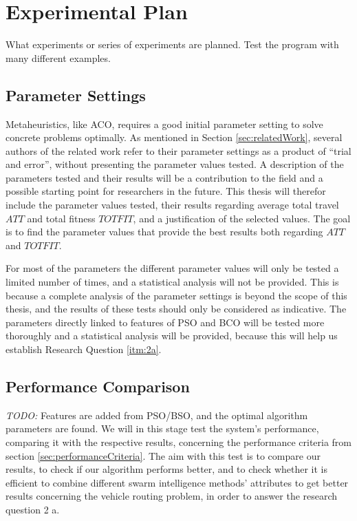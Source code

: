 \section{Experimental Plan}

What experiments or series of experiments are planned. Test the program with many different examples.

\subsection{Parameter Settings}
\label{subsec:parameterSettings_plan}
Metaheuristics, like ACO, requires a good initial parameter setting to solve concrete problems optimally. As mentioned in Section \vref{sec:relatedWork}, several authors of the related work refer to their parameter settings as a product of ``trial and error'', without presenting the parameter values tested. A description of the parameters tested and their results will be a contribution to the field and a possible starting point for researchers in the future. This thesis will therefor include the parameter values tested, their results regarding average total travel $ATT$ and total fitness $TOTFIT$, and a justification of the selected values. The goal is to find the parameter values that provide the best results both regarding $ATT$ and $TOTFIT$.

For most of the parameters the different parameter values will only be tested a limited number of times, and a statistical analysis will not be provided. This is because a complete analysis of the parameter settings is beyond the scope of this thesis, and the results of these tests should only be considered as indicative. The parameters directly linked to features of PSO and BCO will be tested more thoroughly and a statistical analysis will be provided, because this will help us establish Research Question \vref{itm:2a}. 

\subsection{Performance Comparison}
\emph{\color{blue}TODO:} Features are added from PSO/BSO, and the optimal algorithm parameters are found. We will in this stage test the system's performance, comparing it with the respective results, concerning the performance criteria from section \vref{sec:performanceCriteria}. %
The aim with this test is to compare our results, to check if our algorithm performs better, and to check whether it is efficient to combine different swarm intelligence methods' attributes to get better results concerning the vehicle routing problem, in order to answer the research question 2 a.

